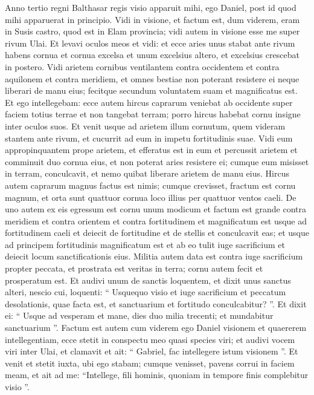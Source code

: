 \begin{biblechapter}
\begin{biblechapter}
\begin{biblechapter}
\begin{biblechapter}
\begin{biblechapter}
\begin{biblechapter}
\begin{biblechapter}
\begin{biblechapter}
\verse Anno tertio regni Balthasar regis visio apparuit mihi, ego Daniel, post id quod mihi apparuerat in principio. 
\verse Vidi in visione, et factum est, dum viderem, eram in Susis castro, quod est in Elam provincia; vidi autem in visione esse me super rivum Ulai. 
\verse Et levavi oculos meos et vidi: et ecce aries unus stabat ante rivum habens cornua et cornua excelsa et unum excelsius altero, et excelsius crescebat in postero. 
\verse Vidi arietem cornibus ventilantem contra occidentem et contra aquilonem et contra meridiem, et omnes bestiae non poterant resistere ei neque liberari de manu eius; fecitque secundum voluntatem suam et magnificatus est. 
\verse Et ego intellegebam: ecce autem hircus caprarum veniebat ab occidente super faciem totius terrae et non tangebat terram; porro hircus habebat cornu insigne inter oculos suos. 
\verse Et venit usque ad arietem illum cornutum, quem videram stantem ante rivum, et cucurrit ad eum in impetu fortitudinis suae. 
\verse Vidi eum appropinquantem prope arietem, et efferatus est in eum et percussit arietem et comminuit duo cornua eius, et non poterat aries resistere ei; cumque eum misisset in terram, conculcavit, et nemo quibat liberare arietem de manu eius. 
\verse Hircus autem caprarum magnus factus est nimis; cumque crevisset, fractum est cornu magnum, et orta sunt quattuor cornua loco illius per quattuor ventos caeli. 
\verse De uno autem ex eis egressum est cornu unum modicum et factum est grande contra meridiem et contra orientem et contra fortitudinem 
\verse et magnificatum est usque ad fortitudinem caeli et deiecit de fortitudine et de stellis et conculcavit eas; 
\verse et usque ad principem fortitudinis magnificatum est et ab eo tulit iuge sacrificium et deiecit locum sanctificationis eius. 
\verse Militia autem data est contra iuge sacrificium propter peccata, et prostrata est veritas in terra; cornu autem fecit et prosperatum est.
 \verse Et audivi unum de sanctis loquentem, et dixit unus sanctus alteri, nescio cui, loquenti: “ Usquequo visio et iuge sacrificium et peccatum desolationis, quae facta est, et sanctuarium et fortitudo conculcabitur? ”. 
\verse Et dixit ei: “ Usque ad vesperam et mane, dies duo milia trecenti; et mundabitur sanctuarium ”.
 \verse Factum est autem cum viderem ego Daniel visionem et quaererem intellegentiam, ecce stetit in conspectu meo quasi species viri; 
\verse et audivi vocem viri inter Ulai, et clamavit et ait: “ Gabriel, fac intellegere istum visionem ”. 
 \verse Et venit et stetit iuxta, ubi ego stabam; cumque venisset, pavens corrui in faciem meam, et ait ad me: “Intellege, fili hominis, quoniam in tempore finis complebitur visio ”. 

\end{biblechapter}
\end{biblechapter}
\end{biblechapter}
\end{biblechapter}
\end{biblechapter}
\end{biblechapter}
\end{biblechapter}
\end{biblechapter}
